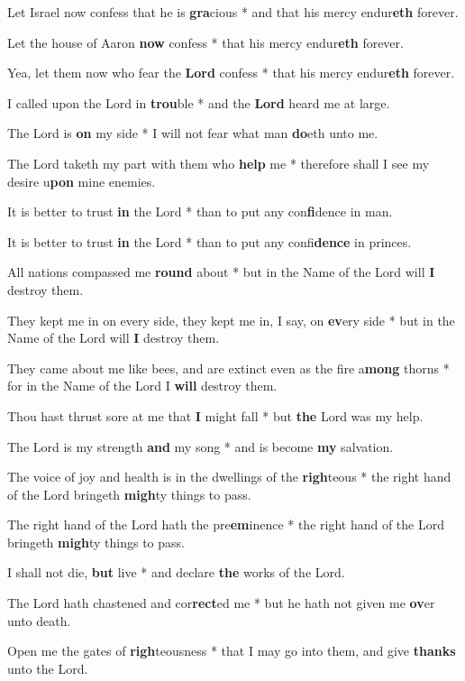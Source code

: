 \begin{multicols}{2}
	Let Israel now confess that he is \textbf{gra}cious * and that his mercy endur\textbf{eth} forever.
	
	Let the house of Aaron \textbf{now} confess * that his mercy endur\textbf{eth} forever.
	
	Yea, let them now who fear the \textbf{Lord} confess * that his mercy endur\textbf{eth} forever.
	
	I called upon the Lord in \textbf{trou}ble * and the \textbf{Lord} heard me at large.
	
	The Lord is \textbf{on} my side * I will not fear what man \textbf{do}eth unto me.
	
	The Lord taketh my part with them who \textbf{help} me * therefore shall I see my desire u\textbf{pon} mine enemies.
	
	It is better to trust \textbf{in} the Lord * than to put any con\textbf{fi}dence in man.
	
	It is better to trust \textbf{in} the Lord * than to put any confi\textbf{dence} in princes.
	
	All nations compassed me \textbf{round} about * but in the Name of the Lord will \textbf{I} destroy them.
	
	They kept me in on every side, they kept me in, I say, on \textbf{ev}ery side * but in the Name of the Lord will \textbf{I} destroy them.
	
	They came about me like bees, and are extinct even as the fire a\textbf{mong} thorns * for in the Name of the Lord I \textbf{will} destroy them.
	
	Thou hast thrust sore at me that \textbf{I} might fall * but \textbf{the} Lord was my help.
	
	The Lord is my strength \textbf{and} my song * and is become \textbf{my} salvation.
	
	The voice of joy and health is in the dwellings of the \textbf{righ}teous * the right hand of the Lord bringeth \textbf{migh}ty things to pass.
	
	The right hand of the Lord hath the pre\textbf{em}inence * the right hand of the Lord bringeth \textbf{migh}ty things to pass.
	
	I shall not die, \textbf{but} live * and declare \textbf{the} works of the Lord.
	
	The Lord hath chastened and cor\textbf{rect}ed me * but he hath not given me \textbf{ov}er unto death.
	
	Open me the gates of \textbf{righ}teousness * that I may go into them, and give \textbf{thanks} unto the Lord.
	

\end{multicols}
